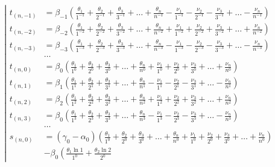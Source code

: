 \begin{equation*} \left| \begin{aligned}
t_{(n,-1)} &=
  \beta_{-1}
  \left(
  \frac{\theta_1}{1^{-1}}
+ \frac{\theta_2}{2^{-1}}
+ \frac{\theta_3}{3^{-1}}
+ \ldots
+ \frac{\theta_n}{n^{-1}}
- \frac{\nu_1}{1^{-1}}
- \frac{\nu_2}{2^{-1}}
- \frac{\nu_3}{3^{-1}}
+ \ldots
- \frac{\nu_n}{n^{-1}}
  \right) \\
%
t_{(n,-2)} &=
  \beta_{-2}
  \left(
  \frac{\theta_1}{1^{-2}}
+ \frac{\theta_2}{2^{-2}}
+ \frac{\theta_3}{3^{-2}}
+ \ldots
+ \frac{\theta_n}{n^{-2}}
+ \frac{\nu_1}{1^{-2}}
+ \frac{\nu_2}{2^{-2}}
+ \frac{\nu_3}{3^{-2}}
+ \ldots
+ \frac{\nu_n}{n^{-2}}
  \right) \\
%
t_{(n,-3)} &=
  \beta_{-3}
  \left(
  \frac{\theta_1}{1^{-3}}
+ \frac{\theta_2}{2^{-3}}
+ \frac{\theta_3}{3^{-3}}
+ \ldots
+ \frac{\theta_n}{n^{-3}}
- \frac{\nu_1}{1^{-3}}
- \frac{\nu_2}{2^{-3}}
- \frac{\nu_3}{3^{-3}}
+ \ldots
- \frac{\nu_n}{n^{-3}}
  \right) \\
%
&\ldots \\
%
t_{(n,0)} &=
  \beta_0
  \left(
  \frac{\theta_1}{1^0}
+ \frac{\theta_2}{2^0}
+ \frac{\theta_3}{3^0}
+ \ldots
+ \frac{\theta_n}{n^0}
+ \frac{\nu_1}{1^0}
+ \frac{\nu_2}{2^0}
+ \frac{\nu_3}{3^0}
+ \ldots
+ \frac{\nu_n}{n^0}
  \right) \\
%
t_{(n,1)} &=
  \beta_1
  \left(
  \frac{\theta_1}{1^1}
+ \frac{\theta_2}{2^1}
+ \frac{\theta_3}{3^1}
+ \ldots
+ \frac{\theta_n}{n^1}
- \frac{\nu_1}{1^1}
- \frac{\nu_2}{2^1}
- \frac{\nu_3}{3^1}
+ \ldots
- \frac{\nu_n}{n^1}
  \right) \\
%
t_{(n,2)} &=
  \beta_2
  \left(
  \frac{\theta_1}{1^2}
+ \frac{\theta_2}{2^2}
+ \frac{\theta_3}{3^2}
+ \ldots
+ \frac{\theta_n}{n^2}
+ \frac{\nu_1}{1^2}
+ \frac{\nu_2}{2^2}
+ \frac{\nu_3}{3^2}
+ \ldots
+ \frac{\nu_n}{n^2}
  \right) \\
%
t_{(n,3)} &=
  \beta_0
  \left(
  \frac{\theta_1}{1^3}
+ \frac{\theta_2}{2^3}
+ \frac{\theta_3}{3^3}
+ \ldots
+ \frac{\theta_n}{n^3}
- \frac{\nu_1}{1^3}
- \frac{\nu_2}{2^3}
- \frac{\nu_3}{3^3}
+ \ldots
- \frac{\nu_n}{n^3}
  \right) \\
%
&\ldots \\
%
s_{(n,0)} &=
  (\gamma_0 - \alpha_0)
  \left(
  \frac{\theta_1}{1^0}
+ \frac{\theta_2}{2^0}
+ \frac{\theta_3}{3^0}
+ \ldots
+ \frac{\theta_n}{n^0}
+ \frac{\nu_1}{1^0}
+ \frac{\nu_2}{2^0}
+ \frac{\nu_3}{3^0}
+ \ldots
+ \frac{\nu_n}{n^0}
  \right) \\ &
- \beta_0
  \left(
  \frac{\theta_1 \ln{1}}{1^0}
+ \frac{\theta_2 \ln{2}}{2^0}

\end{aligned}
\end{equation*}
